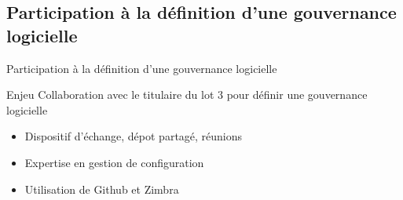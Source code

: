 \subsection{Participation à la définition d'une gouvernance logicielle}
\begin{frame}{\normalsize Participation à la définition d'une gouvernance logicielle}
			\begin{block}{Enjeu}
				Collaboration avec le titulaire du lot \no{}3 pour définir une gouvernance logicielle
			\end{block}
			\begin{itemize}
				\item Dispositif d'échange, dépot partagé, réunions
				\item Expertise en gestion de configuration
				\item Utilisation de Github et Zimbra
			\end{itemize}
\end{frame}